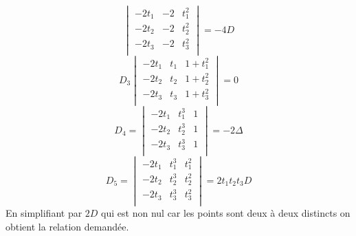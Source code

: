 \begin{enumerate}
\begin{enumerate}
\begin{displaymath}
\begin{vmatrix}
  -2t_1 & -2 & t_1^2 \\
  -2t_2 & -2 & t_2^2 \\
  -2t_3 & -2 & t_3^2 \\
 \end{vmatrix}
=-4 D
\end{displaymath}
\begin{displaymath}
D_3
 \begin{vmatrix}
  -2t_1 & t_1 & 1+t_1^2 \\
  -2t_2 & t_2 & 1+t_2^2 \\
  -2t_3 & t_3 & 1+t_3^2 \\
 \end{vmatrix}
=0
\end{displaymath}
\begin{displaymath}
D_4=
 \begin{vmatrix}
  -2t_1 & t_1^3 & 1 \\
  -2t_2 & t_2^3 & 1 \\
  -2t_3 & t_3^3 & 1 \\
 \end{vmatrix}
=-2\Delta
\end{displaymath}
\begin{displaymath}
D_5=
 \begin{vmatrix}
  -2t_1 & t_1^3 & t_1^2 \\
  -2t_2 & t_2^3 & t_2^2 \\
  -2t_3 & t_3^3 & t_3^2 \\
 \end{vmatrix}
=2t_1t_2t_3 D
\end{displaymath}
En simplifiant par $2D$ qui est non nul car les points sont deux à deux distincts on obtient la relation demandée.
\end{enumerate}


\end{enumerate}
